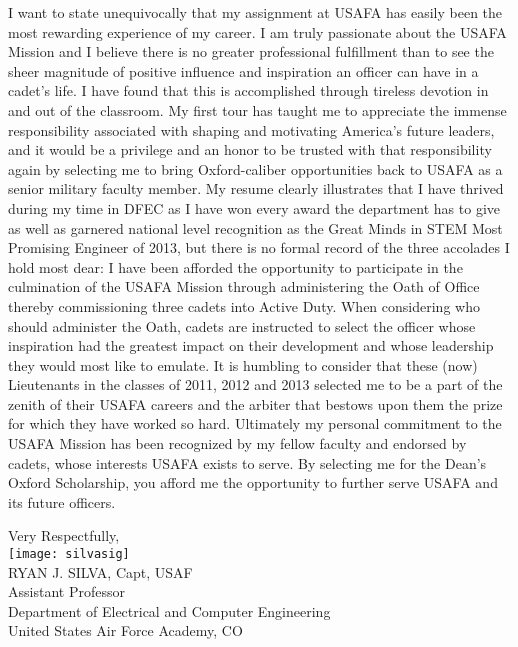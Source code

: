 \documentclass{article}
\begin{document}
I want to state unequivocally that my assignment at USAFA has easily been the
most rewarding experience of my career. I am truly passionate about the USAFA
Mission and I believe there is no greater professional fulfillment than to see
the sheer magnitude of positive influence and inspiration an officer can have
in a cadet's life. I have found that this is accomplished through tireless
devotion in and out of the classroom. My first tour has taught me to appreciate
the immense responsibility associated with shaping and motivating America's
future leaders, and it would be a privilege and an honor to be trusted with
that responsibility again by selecting me to bring Oxford-caliber opportunities
back to USAFA as a senior military faculty member. My resume clearly illustrates that I have thrived during my time in DFEC as I
have won every award the department has to give as well as garnered national
level recognition as the Great Minds in STEM Most Promising Engineer of 2013,
but there is no formal record of the three accolades I hold most dear: I have been
afforded the opportunity to participate in the culmination of the USAFA Mission
through administering the Oath of Office thereby commissioning three cadets into
Active Duty. When considering who should administer the Oath, cadets are
instructed to select the officer whose inspiration had the greatest impact on
their development and whose leadership they would most like to emulate. It is
humbling to consider that these (now) Lieutenants in the classes of 2011, 2012
and 2013 selected me to be a part of the zenith of their USAFA careers and the
arbiter that bestows upon them the prize for which they have worked so hard.
Ultimately my personal commitment to the USAFA Mission has been recognized by
my fellow faculty and endorsed by cadets, whose interests USAFA exists to
serve. By selecting me for the Dean's Oxford Scholarship, you afford me the opportunity
to further serve USAFA and its future officers.

\vspace{10mm}
\hspace*{2.3in} \noindent Very Respectfully, \\
\hspace*{2.5in} \texttt{[image: silvasig]}  \\
\hspace*{2.5in} RYAN J. SILVA, Capt, USAF \\
\hspace*{2.5in} Assistant Professor   \\
\hspace*{2.5in} Department of Electrical and Computer Engineering  \\
\hspace*{2.5in} United States Air Force Academy, CO  \\
\renewcommand\contentsname{Attachments}\tableofcontents
\end{document}
